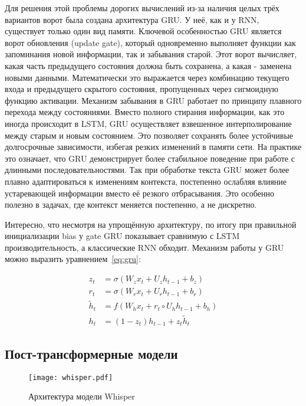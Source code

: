 Для решения этой проблемы дорогих вычислений из-за наличия целых трёх вариантов ворот была создана архитектура GRU.
У неё, как и у RNN, существует только один вид памяти.
Ключевой особенностью GRU является ворот обновления (update gate), который одновременно выполняет функции как запоминания новой информации, так и забывания старой.
Этот ворот вычисляет, какая часть предыдущего состояния должна быть сохранена, а какая - заменена новыми данными.
Математически это выражается через комбинацию текущего входа и предыдущего скрытого состояния, пропущенных через сигмоидную функцию активации.
Механизм забывания в GRU работает по принципу плавного перехода между состояниями. Вместо полного стирания информации, как это иногда происходит в LSTM, GRU осуществляет взвешенное интерполирование между старым и новым состоянием. Это позволяет сохранять более устойчивые долгосрочные зависимости, избегая резких изменений в памяти сети.
На практике это означает, что GRU демонстрирует более стабильное поведение при работе с длинными последовательностями.
Так при обработке текста GRU может более плавно адаптироваться к изменениям контекста, постепенно ослабляя влияние устаревающей информации вместо её резкого отбрасывания.
Это особенно полезно в задачах, где контекст меняется постепенно, а не дискретно.

Интересно, что несмотря на упрощённую архитектуру, по итогу при правильной инициализации bias у gate GRU показывает сравнимую с LSTM производительность, а классические RNN обходит.
Механизм работы у GRU можно выразить уравнением~\ref{eq:gru}:

\begin{equation}
  \begin{aligned}
    z_t &= \sigma(W_z x_t + U_z h_{t-1} + b_z) \\
    r_t &= \sigma(W_r x_t + U_r h_{t-1} + b_r) \\
    \tilde{h}_t &= f(W_h x_t + r_t \circ U_h h_{t-1} + b_h) \\
    h_t &= (1 - z_t) h_{t-1} + z_t \tilde{h}_t
  \end{aligned}
  \label{eq:gru}
\end{equation}

\subsection{Пост-трансформерные модели}

\begin{figure}[!t]
  \centering
  \texttt{[image: whisper.pdf]}
  \caption{Архитектура модели Whisper}
  \label{fig:whisper}
\end{figure}

